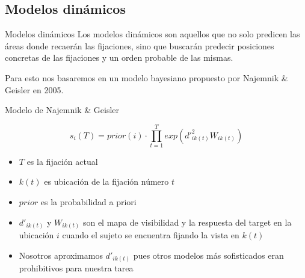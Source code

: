 \documentclass[compress]{beamer}
\begin{document}
\subsection{Modelos dinámicos}
\begin{frame}{Modelos dinámicos}
Los modelos dinámicos son aquellos que no solo predicen las áreas donde
recaerán las fijaciones, sino que buscarán predecir posiciones concretas de las fijaciones y un orden probable de las mismas.

\bigskip

Para esto nos basaremos en un modelo bayesiano propuesto por Najemnik \& Geisler en 2005. 
\end{frame}

\begin{frame}{Modelo de Najemnik \& Geisler}

$$s_{i}(T) = prior(i) \cdot \prod_{t=1}^T exp\left(d'^2_{ik(t)} W_{ik(t)}\right)$$

\begin{itemize}
\item $T$ es la fijación actual
\item $k(t)$ es ubicación de la fijación número $t$
\item $prior$ es la probabilidad a priori
\item $d'_{ik(t)}$ y $W_{ik(t)}$ son el mapa de visibilidad y la respuesta del target en la ubicación $i$ cuando el sujeto se encuentra fijando la vista en $k(t)$
\item Nosotros aproximamos $d'_{ik(t)}$ pues otros modelos más sofisticados eran prohibitivos para nuestra tarea
\end{itemize}
\end{frame}



\end{document}
